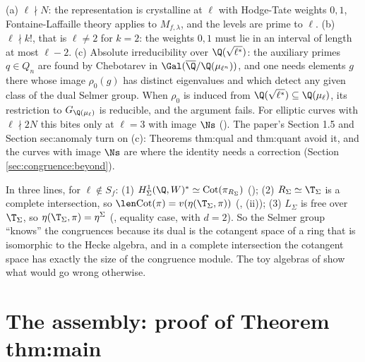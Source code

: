\begin{remark}\label{rem:congruence:where-hypothesis}
(a) $\ell\nmid N$: the representation is crystalline at $\ell$ with Hodge-Tate weights $0,1$, Fontaine-Laffaille theory applies to $M_{f,\lambda}$, and the levels are prime to $\ell$.
(b) $\ell\nmid k!$, that is $\ell\ne2$ for $k=2$: the weights $0,1$ must lie in an interval of length at most $\ell-2$.
(c) Absolute irreducibility over $\Q(\sqrt{\ell^*})$: the auxiliary primes $q\in Q_n$ are found by Chebotarev in $\Gal(\overline\Q/\Q(\mu_{\ell^n}))$, and one needs elements $g$ there whose image $\rho_0(g)$ has
distinct eigenvalues and which detect any given class of the dual Selmer group. When $\rho_0$ is induced from $\Q(\sqrt{\ell^*})\subseteq\Q(\mu_\ell)$, its restriction to $G_{\Q(\mu_\ell)}$ is reducible, and the argument
fails. For elliptic curves with $\ell\nmid2N$ this bites only at $\ell=3$ with image $\Ns$ ().
The paper's Section 1.5 and Section sec:anomaly turn on (c): Theorems thm:qual and thm:quant avoid it, and the curves with image $\Ns$ are where the identity needs a correction
(Section \ref{sec:congruence:beyond}).
\end{remark}

\begin{remark}\label{rem:congruence:why-length-equals-eta}
In three lines, for $\ell\notin S_f$:
(1) $H^1_\Sigma(\Q,W)^*\simeq\mathrm{Cot}(\pi_{R_\Sigma})$ ();
(2) $R_\Sigma\simeq\T_\Sigma$ is a complete intersection, so $\len\mathrm{Cot}(\pi)=v(\eta(\T_\Sigma,\pi))$ (, (ii));
(3) $L_\Sigma$ is free over $\T_\Sigma$, so $\eta(\T_\Sigma,\pi)=\eta^\Sigma$ (, equality case, with $d=2$).
So the Selmer group ``knows'' the congruences because its dual is the cotangent space of a ring that is isomorphic to the Hecke algebra, and in a complete intersection the
cotangent space has exactly the size of the congruence module. The toy algebras of  show what would go wrong otherwise.
\end{remark}

\section{The assembly: proof of Theorem thm:main}\label{sec:congruence:assembly}

